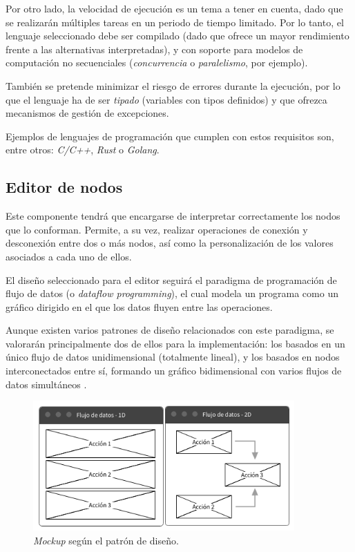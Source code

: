 Por otro lado, la velocidad de ejecución es un tema a tener en cuenta, dado que se realizarán múltiples tareas en un periodo de tiempo limitado. Por lo tanto, el lenguaje seleccionado debe ser compilado (dado que ofrece un mayor rendimiento frente a las alternativas interpretadas), y con soporte para modelos de computación no secuenciales (\textit{concurrencia} o \textit{paralelismo}, por ejemplo).\sn

También se pretende minimizar el riesgo de errores durante la ejecución, por lo que el lenguaje ha de ser \textit{tipado} (variables con tipos definidos) y que ofrezca mecanismos de gestión de excepciones.\sn

Ejemplos de lenguajes de programación que cumplen con estos requisitos son, entre otros: \textit{C/C++}, \textit{Rust} o \textit{Golang}.

\subsection{Editor de nodos} \label{sub:nodeeditor}

Este componente tendrá que encargarse de interpretar correctamente los nodos que lo conforman. Permite, a su vez, realizar operaciones de conexión y desconexión entre dos o más nodos, así como la personalización de los valores asociados a cada uno de ellos.\sn

El diseño seleccionado para el editor seguirá el paradigma de programación de flujo de datos (o \textit{dataflow programming}), el cual modela un programa como un gráfico dirigido en el que los datos fluyen entre las operaciones.\sn

Aunque existen varios patrones de diseño relacionados con este paradigma, se valorarán principalmente dos de ellos para la implementación: los basados en un único flujo de datos unidimensional (totalmente lineal), y los basados en nodos interconectados entre sí, formando un gráfico bidimensional con varios flujos de datos simultáneos .\sn

\begin{figure}[h]
    \centering
    \includegraphics[width=10cm]{img/tables/06_Mockup-Dataflow-Types.png}
    \caption{\textit{Mockup} según el patrón de diseño.}
    \label{fig:mockupdataflow}
\end{figure}
\vspace{0.3cm}

